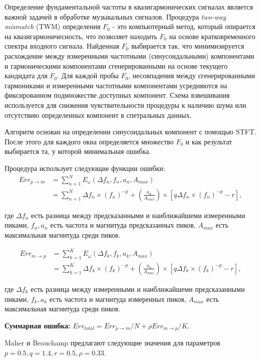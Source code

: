Определение фундаментальной частоты в квазигармонических сигналах
является важной задачей в обработке музыкальных сигналов.
Процедура \textit{two-way mismatch} (TWM) определения $F_0$ -
это компьютерный метод, который опирается на квазигармоничесность,
что позволяет находить $F_0$ на основе кратковременного спектра входного
сигнала.
Найденная $F_0$ выбирается так, что минимизируется расхождение между
измеренными частотными (синусоидальными) компонентами и гармоническими
компонентами сгенерированными на основе текущего кандидата для $F_0$.
Для каждой пробы $F_0$, несовпадения между сгенерированными гармониками
и измеренными частотными компонентами усредняются на фиксированном
подмножестве доступных компонент. Схема взвешивания используется для
снижения чувствительности процедуры к наличию шума или отсутствию
определенных компонент в спетральных данных.

Алгоритм основан на определении синусоидальных компонент с помощью STFT.
После этого для каждого окна определяется множество $F_0$ и как результат
выбирается та, у которой минимальная ошибка.

Процедура использует следующие функции ошибки:
\begin{align}
  Err_{p \to m} &= \sum_{n=1}^N E_\omega (\Delta f_n, f_n, a_n, A_{max}) \\
                &= \sum_{n=1}^N \Delta f_n \times (f_n) ^{-p} +
                       (\frac{a_n}{A_{max}}) \times [q \Delta f_n \times
                       (f_n)^{-p} - r],
\end{align}

где $\Delta f_n$ есть разница между предсказанными и наиближайшеми измеренными
пиками, $f_n, a_n$ есть частота и магнитуда предсказанных пиков,
$A_{max}$ есть максимальная магнитуда среди пиков.

\begin{align}
  Err_{m \to p} &= \sum_{k=1}^K E_\omega (\Delta f_k, f_k, a_k, A_{max}) \\
                &= \sum_{k=1}^K \Delta f_k \times (f_k) ^{-p} +
                       (\frac{a_k}{A_{max}}) \times [q \Delta f_k \times
                       (f_k)^{-p} - r],
\end{align}

где $\Delta f_k$ есть разница между измеренными и наиближайшеми предсказанными
пиками, $f_k, a_k$ есть частота и магнитуда измеренных пиков,
$A_{max}$ есть максимальная магнитуда среди пиков.

\textbf{Суммарная ошибка:} $Err_{total} = Err_{p \to m}/N + \rho Err_{m \to p}/K$.

Maher и Beauchamp предлагают следующие значения для параметров
$p=0.5, q=1.4, r=0.5, \rho=0.33$.
